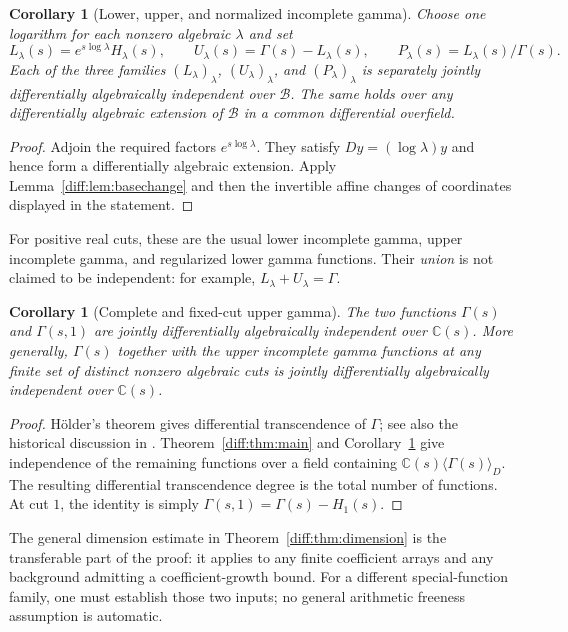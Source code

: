 \documentclass[11pt,a4paper]{article}
\newcommand{\C}{\mathbb C}
\newcommand{\B}{\mathscr B}
\newtheorem{corollary}[theorem]{Corollary}
\theoremstyle{definition}
\theoremstyle{remark}
\numberwithin{equation}{section}
\begin{document}
\begin{corollary}[Lower, upper, and normalized incomplete gamma]
\label{diff:cor:normalized}
Choose one logarithm for each nonzero algebraic $\lambda$ and set
\[
 L_\lambda(s)=e^{s\log\lambda}H_\lambda(s),\qquad
 U_\lambda(s)=\Gamma(s)-L_\lambda(s),\qquad
 P_\lambda(s)=L_\lambda(s)/\Gamma(s).
\]
Each of the three families $(L_\lambda)_\lambda$,
$(U_\lambda)_\lambda$, and $(P_\lambda)_\lambda$ is separately
jointly differentially algebraically independent over $\B$.
The same holds over any differentially algebraic extension of $\B$
in a common differential overfield.
\end{corollary}
\begin{proof}
Adjoin the required factors $e^{s\log\lambda}$. They satisfy
$Dy=(\log\lambda)y$ and hence form a differentially algebraic
extension. Apply Lemma~\ref{diff:lem:basechange} and then the invertible
affine changes of coordinates displayed in the statement.
\end{proof}

For positive real cuts, these are the usual lower incomplete gamma,
upper incomplete gamma, and regularized lower gamma functions. Their
\emph{union} is not claimed to be independent: for example,
$L_\lambda+U_\lambda=\Gamma$.

\begin{corollary}[Complete and fixed-cut upper gamma]\label{diff:cor:pair}
The two functions $\Gamma(s)$ and $\Gamma(s,1)$ are jointly
differentially algebraically independent over $\C(s)$.
More generally, $\Gamma(s)$ together with the upper incomplete
gamma functions at any finite set of distinct nonzero algebraic cuts
is jointly differentially algebraically independent over $\C(s)$.
\end{corollary}
\begin{proof}
H\"older's theorem gives differential transcendence of $\Gamma$;
see also the historical discussion in \cite{ADH}. Theorem~\ref{diff:thm:main}
and Corollary~\ref{diff:cor:normalized} give independence of the remaining
functions over a field containing $\C(s)\langle\Gamma(s)\rangle_D$.
The resulting differential transcendence degree is the total number
of functions. At cut $1$, the identity is simply
$\Gamma(s,1)=\Gamma(s)-H_1(s)$.
\end{proof}

The general dimension estimate in Theorem~\ref{diff:thm:dimension}
is the transferable part of the proof: it applies to any finite
coefficient arrays and any background admitting a coefficient-growth
bound. For a different special-function family, one must establish
those two inputs; no general arithmetic freeness assumption is automatic.
\end{document}
